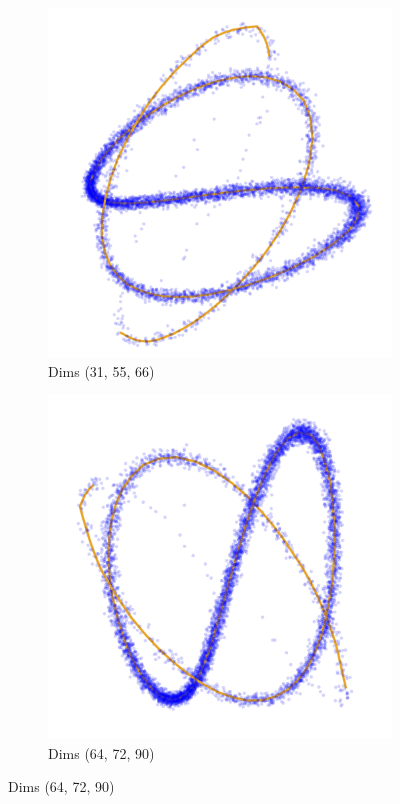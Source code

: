 \begin{figure}[htbp]
\begin{subfigure}[t]{0.30\textwidth}
        \includegraphics[width=\textwidth]{Chapter5/results/visualisations/RAE/projections/sinusoid_1_100/more_transparent/31_55_66.jpg}
        \caption{Dims (31, 55, 66)}
    \end{subfigure}
    \hfill
    \begin{subfigure}[t]{0.30\textwidth}
        \includegraphics[width=\textwidth]{Chapter5/results/visualisations/RAE/projections/sinusoid_1_100/more_transparent/64_72_90.jpg}
        \caption{Dims (64, 72, 90)}
    \end{subfigure}


\end{figure}
